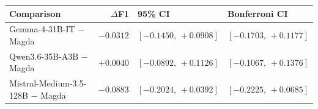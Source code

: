 \begin{tabular}{@{}>{\raggedright\arraybackslash}p{39mm}rll@{}}
\toprule
Comparison & $\Delta$F1 & 95\% CI & Bonferroni CI \\
\midrule
Gemma-4-31B-IT $-$ Magda & $-0.0312$ & $[-0.1450,\,+0.0908]$ & $[-0.1703,\,+0.1177]$ \\
Qwen3.6-35B-A3B $-$ Magda & $+0.0040$ & $[-0.0892,\,+0.1126]$ & $[-0.1067,\,+0.1376]$ \\
Mistral-Medium-3.5-128B $-$ Magda & $-0.0883$ & $[-0.2024,\,+0.0392]$ & $[-0.2225,\,+0.0685]$ \\
\bottomrule
\end{tabular}
